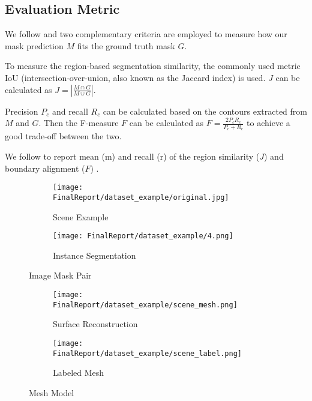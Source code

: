 \subsection{Evaluation Metric}

We follow \cite{jabri2020walk} and two complementary criteria are employed to measure how our mask prediction $M$ fits the ground truth mask $G$. 

\par {} To measure the region-based segmentation similarity, the commonly used metric IoU (intersection-over-union, also known as the Jaccard index) is used. $J$ can be calculated as $J = \left| \frac{M \cap G}{M \cup G} \right|$.



\par {} Precision $P_c$ and recall $R_c$ can be calculated based on the contours extracted from $M$ and $G$. Then the F-measure $F$ can be calculated as $F = \frac{2P_cR_c}{P_c + R_c}$ to achieve a good trade-off between the two.

We follow \cite{jabri2020walk} to report mean (m) and recall (r) of the region similarity ($J$) and boundary alignment ($F$) \cite{perazzi2016benchmark}.


\begin{figure}[H]
  \centering
  \begin{subfigure}[b]{0.4\columnwidth}
    \texttt{[image: FinalReport/dataset\_example/original.jpg]}
    \caption{Scene Example}
  \end{subfigure}
  \begin{subfigure}[b]{0.4\columnwidth}
    \texttt{[image: FinalReport/dataset\_example/4.png]}
    \caption{Instance Segmentation}
  \end{subfigure}
  \vspace{-0.1in}
  \caption{Image Mask Pair \cite{dai2017scannet}}
  \label{fig:impair}
      \vspace{-0.2in}
\end{figure}


\begin{figure}[H]
  \centering
  \begin{subfigure}[b]{0.44\columnwidth}
    \texttt{[image: FinalReport/dataset\_example/scene\_mesh.png]}
    \caption{Surface Reconstruction}

  \end{subfigure}
  \begin{subfigure}[b]{0.41\columnwidth}
    \texttt{[image: FinalReport/dataset\_example/scene\_label.png]}
    \caption{Labeled Mesh}
  \end{subfigure}
    \vspace{-0.1in}
  \caption{Mesh Model \cite{dai2017scannet}}
      \vspace{-0.25in}
  \label{fig:mesh}
\end{figure}




